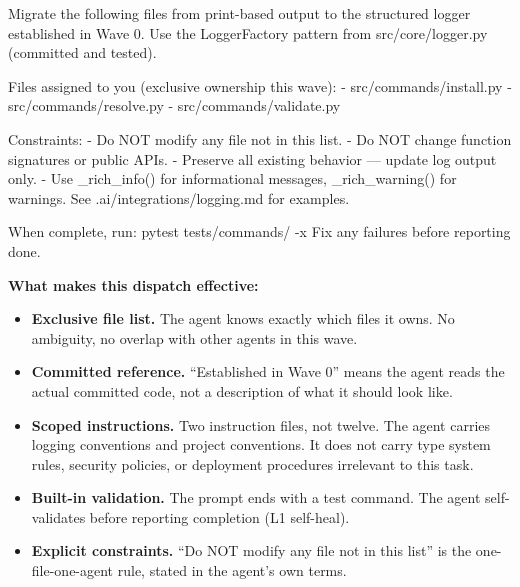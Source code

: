 \documentclass[
  a4paper,
  DIV=11,
  numbers=noendperiod]{scrreprt}
\newenvironment{Shaded}{\begin{snugshade}}{\end{snugshade}}
\newcommand{\NormalTok}[1]{\textcolor[rgb]{0.00,0.23,0.31}{#1}}
\providecommand{\tightlist}{%
  \setlength{\itemsep}{0pt}\setlength{\parskip}{0pt}}
\begin{document}
\begin{Shaded}
\begin{Highlighting}[]
\NormalTok{Migrate the following files from print{-}based output to the structured}
\NormalTok{logger established in Wave 0. Use the LoggerFactory pattern from}
\NormalTok{src/core/logger.py (committed and tested).}

\NormalTok{Files assigned to you (exclusive ownership this wave):}
\NormalTok{  {-} src/commands/install.py}
\NormalTok{  {-} src/commands/resolve.py}
\NormalTok{  {-} src/commands/validate.py}

\NormalTok{Constraints:}
\NormalTok{  {-} Do NOT modify any file not in this list.}
\NormalTok{  {-} Do NOT change function signatures or public APIs.}
\NormalTok{  {-} Preserve all existing behavior — update log output only.}
\NormalTok{  {-} Use \_rich\_info() for informational messages, \_rich\_warning()}
\NormalTok{    for warnings. See .ai/integrations/logging.md for examples.}

\NormalTok{When complete, run: pytest tests/commands/ {-}x}
\NormalTok{Fix any failures before reporting done.}
\end{Highlighting}
\end{Shaded}

\textbf{What makes this dispatch effective:}

\begin{itemize}
\tightlist
\item
  \textbf{Exclusive file list.} The agent knows exactly which files it
  owns. No ambiguity, no overlap with other agents in this wave.
\item
  \textbf{Committed reference.} ``Established in Wave 0'' means the
  agent reads the actual committed code, not a description of what it
  should look like.
\item
  \textbf{Scoped instructions.} Two instruction files, not twelve. The
  agent carries logging conventions and project conventions. It does not
  carry type system rules, security policies, or deployment procedures
  irrelevant to this task.
\item
  \textbf{Built-in validation.} The prompt ends with a test command. The
  agent self-validates before reporting completion (L1 self-heal).
\item
  \textbf{Explicit constraints.} ``Do NOT modify any file not in this
  list'' is the one-file-one-agent rule, stated in the agent's own
  terms.
\end{itemize}
\end{document}
